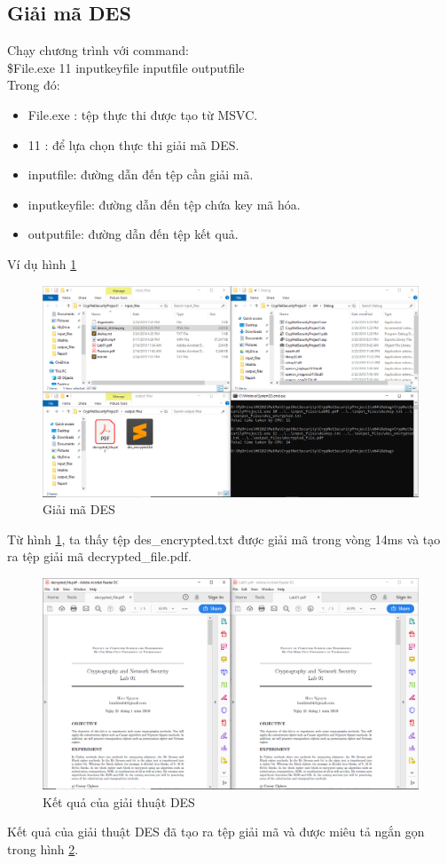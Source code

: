 \documentclass[a4paper]{article}
\begin{document}
	\subsection{Giải mã DES}
    Chạy chương trình với command:\\
    \$File.exe 11 inputkeyfile inputfile outputfile\\
    Trong đó:
    \begin{itemize}
        \item File.exe : tệp thực thi được tạo từ MSVC.
        \item 11 : để lựa chọn thực thi giải mã DES.
        \item inputfile: đường dẫn đến tệp cần giải mã.
        \item inputkeyfile: đường dẫn đến tệp chứa key mã hóa.
        \item outputfile: đường dẫn đến tệp kết quả. 
    \end{itemize}

    Ví dụ hình \ref{fig:desde}
    \begin{figure}[htp]
        \centering
        \includegraphics[scale=0.4]{desde.png}
        \caption{Giải mã DES}
        \label{fig:desde}
    \end{figure}
    Từ hình \ref{fig:desde}, ta thấy tệp des\_encrypted.txt được giải mã trong vòng 14ms và tạo ra tệp giải mã decrypted\_file.pdf.
    \begin{figure}[htp]
        \centering
        \includegraphics[scale=0.4]{descmp.png}
        \caption{Kết quả của giải thuật DES}
        \label{fig:descmp}
    \end{figure}
    Kết quả của giải thuật DES đã tạo ra tệp giải mã và được miêu tả ngắn gọn trong hình \ref{fig:descmp}.
\end{document}
